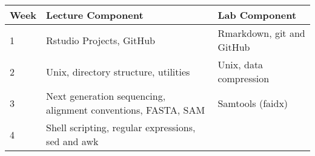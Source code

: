 \documentclass[]{book}
\begin{document}
\begin{longtable}[]{@{}lll@{}}
\toprule
\begin{minipage}[b]{0.13\columnwidth}\raggedright
Week\strut
\end{minipage} & \begin{minipage}[b]{0.46\columnwidth}\raggedright
Lecture Component\strut
\end{minipage} & \begin{minipage}[b]{0.33\columnwidth}\raggedright
Lab Component\strut
\end{minipage}\tabularnewline
\midrule
\endhead
\begin{minipage}[t]{0.13\columnwidth}\raggedright
1\strut
\end{minipage} & \begin{minipage}[t]{0.46\columnwidth}\raggedright
Rstudio Projects, GitHub\strut
\end{minipage} & \begin{minipage}[t]{0.33\columnwidth}\raggedright
Rmarkdown, git and GitHub\strut
\end{minipage}\tabularnewline
\begin{minipage}[t]{0.13\columnwidth}\raggedright
2\strut
\end{minipage} & \begin{minipage}[t]{0.46\columnwidth}\raggedright
Unix, directory structure, utilities\strut
\end{minipage} & \begin{minipage}[t]{0.33\columnwidth}\raggedright
Unix, data compression\strut
\end{minipage}\tabularnewline
\begin{minipage}[t]{0.13\columnwidth}\raggedright
3\strut
\end{minipage} & \begin{minipage}[t]{0.46\columnwidth}\raggedright
Next generation sequencing, alignment conventions, FASTA, SAM\strut
\end{minipage} & \begin{minipage}[t]{0.33\columnwidth}\raggedright
Samtools (faidx)\strut
\end{minipage}\tabularnewline
\begin{minipage}[t]{0.13\columnwidth}\raggedright
4\strut
\end{minipage} & \begin{minipage}[t]{0.46\columnwidth}\raggedright
Shell scripting, regular expressions, sed and awk\strut
\end{minipage} & \begin{minipage}[t]{0.33\columnwidth}\raggedright

\end{minipage}
\end{longtable}
\end{document}
